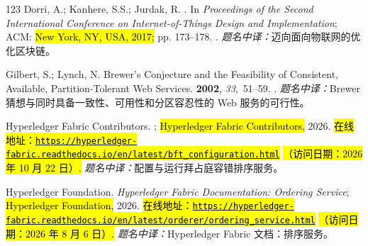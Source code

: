 \begin{thebibliography}{123}
Dorri, A.; Kanhere, S.S.; Jurdak, R.
.
\newblock In \emph{Proceedings of the Second International Conference on
  Internet-of-Things Design and Implementation}; ACM: \hl{New York, NY, USA, 2017;} pp. 173--178.
.
\newblock \textit{题名中译：}迈向面向物联网的优化区块链。

Gilbert, S.; Lynch, N.
\newblock Brewer's Conjecture and the Feasibility of Consistent, Available,
  Partition-Tolerant Web Services.
 {\bf 2002}, {\em 33},~51--59.
.
\newblock \textit{题名中译：}Brewer 猜想与同时具备一致性、可用性和分区容忍性的 Web 服务的可行性。

{Hyperledger Fabric Contributors}.
; \hl{Hyperledger Fabric Contributors,} 2026.
\newblock \hl{在线地址：}\space \href{https://hyperledger-fabric.readthedocs.io/en/latest/bft_configuration.html}{\hl{\mbox{\nolinkurl{https://hyperledger-fabric.readthedocs.io/}}}}\allowbreak\href{https://hyperledger-fabric.readthedocs.io/en/latest/bft_configuration.html}{\hl{\mbox{\nolinkurl{en/}}}}\allowbreak\href{https://hyperledger-fabric.readthedocs.io/en/latest/bft_configuration.html}{\hl{\mbox{\nolinkurl{latest/}}}}\allowbreak\href{https://hyperledger-fabric.readthedocs.io/en/latest/bft_configuration.html}{\hl{\mbox{\nolinkurl{bft_configuration.html}}}} \space\hl{（访问日期：2026 年 10 月 22 日）.}
\newblock \textit{题名中译：}配置与运行拜占庭容错排序服务。

{Hyperledger Foundation}.
\newblock \emph{Hyperledger Fabric Documentation: Ordering Service}; \hl{Hyperledger Foundation,}  2026.
\newblock \hl{在线地址：}\space \href{https://hyperledger-fabric.readthedocs.io/en/latest/orderer/ordering_service.html}{\hl{\mbox{\nolinkurl{https://hyperledger-fabric.readthedocs.io/}}}}\allowbreak\href{https://hyperledger-fabric.readthedocs.io/en/latest/orderer/ordering_service.html}{\hl{\mbox{\nolinkurl{en/}}}}\allowbreak\href{https://hyperledger-fabric.readthedocs.io/en/latest/orderer/ordering_service.html}{\hl{\mbox{\nolinkurl{latest/}}}}\allowbreak\href{https://hyperledger-fabric.readthedocs.io/en/latest/orderer/ordering_service.html}{\hl{\mbox{\nolinkurl{orderer/}}}}\allowbreak\href{https://hyperledger-fabric.readthedocs.io/en/latest/orderer/ordering_service.html}{\hl{\mbox{\nolinkurl{ordering_service.html}}}} \space\hl{（访问日期：2026 年 8 月 6 日）.}
\newblock \textit{题名中译：}Hyperledger Fabric 文档：排序服务。


\end{thebibliography}
